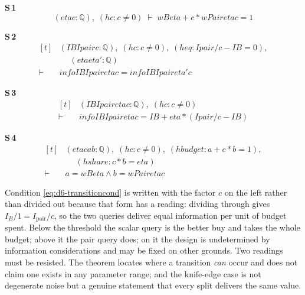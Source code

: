 \noindent\textbf{S\,1}\quad{}
{\footnotesize\[ (\mathit{eta} \mathit{c} : \mathbb{Q} ),\; (\mathit{hc} : \mathit{c} \neq 0) \;\vdash\; \mathit{wB} \mathit{eta} + \mathit{c} * \mathit{wPair} \mathit{eta} \mathit{c} = 1 \]}

\noindent\textbf{S\,2}\quad{}
{\footnotesize\[ \begin{aligned}[t]
&(\mathit{IB} \mathit{Ipair} \mathit{c} : \mathbb{Q} ),\; (\mathit{hc} : \mathit{c} \neq 0),\; (\mathit{heq} : \mathit{Ipair} / \mathit{c} - \mathit{IB} = 0),\\
&\quad \; (\mathit{eta} \mathit{eta'} : \mathbb{Q} )\\
\vdash\;&\mathit{info} \mathit{IB} \mathit{Ipair} \mathit{eta} \mathit{c} = \mathit{info} \mathit{IB} \mathit{Ipair} \mathit{eta'} \mathit{c}
\end{aligned} \]}

\noindent\textbf{S\,3}\quad{}
{\footnotesize\[ \begin{aligned}[t]
&(\mathit{IB} \mathit{Ipair} \mathit{eta} \mathit{c} : \mathbb{Q} ),\; (\mathit{hc} : \mathit{c} \neq 0)\\
\vdash\;&\mathit{info} \mathit{IB} \mathit{Ipair} \mathit{eta} \mathit{c} = \mathit{IB} + \mathit{eta} * (\mathit{Ipair} / \mathit{c} - \mathit{IB})
\end{aligned} \]}

\noindent\textbf{S\,4}\quad{}
{\footnotesize\[ \begin{aligned}[t]
&(\mathit{eta} \mathit{c} \mathit{a} \mathit{b} : \mathbb{Q} ),\; (\mathit{hc} : \mathit{c} \neq 0),\; (\mathit{hbudget} : \mathit{a} + \mathit{c} * \mathit{b} = 1),\\
&\quad \; (\mathit{hshare} : \mathit{c} * \mathit{b} = \mathit{eta})\\
\vdash\;&\mathit{a} = \mathit{wB} \mathit{eta} \wedge \mathit{b} = \mathit{wPair} \mathit{eta} \mathit{c}
\end{aligned} \]}


Condition \eqref{eq:d6-transitioncond} is written with the factor $c$ on the left rather than
divided out because that form has a reading: dividing through gives
$I_{B}/1=I_{\mathrm{pair}}/c$, so the two queries deliver equal information per unit of budget
spent. Below the threshold the scalar query is the better buy and takes the whole budget;
above it the pair query does; on it the design is undetermined by information considerations
and may be fixed on other grounds. Two readings must be resisted. The theorem locates where a
transition \emph{can} occur and does not claim one exists in any parameter range; and the
knife-edge case is not degenerate noise but a genuine statement that every split delivers the
same value.

